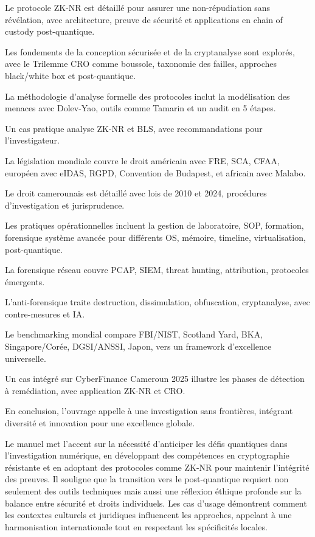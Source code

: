 \documentclass[a4paper,12pt]{extarticle}
\begin{document}
Le protocole ZK-NR est détaillé pour assurer une non-répudiation sans révélation, avec architecture, preuve de sécurité et applications en chain of custody post-quantique.

Les fondements de la conception sécurisée et de la cryptanalyse sont explorés, avec le Trilemme CRO comme boussole, taxonomie des failles, approches black/white box et post-quantique.

La méthodologie d'analyse formelle des protocoles inclut la modélisation des menaces avec Dolev-Yao, outils comme Tamarin et un audit en 5 étapes.

Un cas pratique analyse ZK-NR et BLS, avec recommandations pour l'investigateur.

La législation mondiale couvre le droit américain avec FRE, SCA, CFAA, européen avec eIDAS, RGPD, Convention de Budapest, et africain avec Malabo.

Le droit camerounais est détaillé avec lois de 2010 et 2024, procédures d'investigation et jurisprudence.

Les pratiques opérationnelles incluent la gestion de laboratoire, SOP, formation, forensique système avancée pour différents OS, mémoire, timeline, virtualisation, post-quantique.

La forensique réseau couvre PCAP, SIEM, threat hunting, attribution, protocoles émergents.

L'anti-forensique traite destruction, dissimulation, obfuscation, cryptanalyse, avec contre-mesures et IA.

Le benchmarking mondial compare FBI/NIST, Scotland Yard, BKA, Singapore/Corée, DGSI/ANSSI, Japon, vers un framework d'excellence universelle.

Un cas intégré sur CyberFinance Cameroun 2025 illustre les phases de détection à remédiation, avec application ZK-NR et CRO.

En conclusion, l'ouvrage appelle à une investigation sans frontières, intégrant diversité et innovation pour une excellence globale.

Le manuel met l'accent sur la nécessité d'anticiper les défis quantiques dans l'investigation numérique, en développant des compétences en cryptographie résistante et en adoptant des protocoles comme ZK-NR pour maintenir l'intégrité des preuves. Il souligne que la transition vers le post-quantique requiert non seulement des outils techniques mais aussi une réflexion éthique profonde sur la balance entre sécurité et droits individuels. Les cas d'usage démontrent comment les contextes culturels et juridiques influencent les approches, appelant à une harmonisation internationale tout en respectant les spécificités locales.
\end{document}
